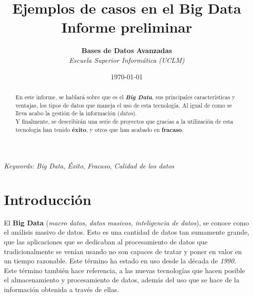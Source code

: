\documentclass[11pt]{diazessay} %
\title{\textbf{Ejemplos de casos en el Big Data \\ Informe preliminar}} %
\author{\textbf{Bases de Datos Avanzadas} \\ \textit{Escuela Superior Informática (UCLM)}} %
\date{\today} %
\begin{document}
\maketitle %




\begin{abstract}
	
En este informe, se hablará sobre que es el \textbf{\textit{Big Data}}, sus principales características y ventajas, los tipos de datos que maneja el uso de esta tecnología. Al igual de como se lleva acabo la gestión de la información (\textit{datos}).\\

Y finalmente, se describirán una serie de proyectos que gracias a la utilización de esta tecnología han tenido \textbf{éxito}, y otros que han acabado en \textbf{fracaso}.
\end{abstract}

\hspace*{3.6mm}\textit{Keywords:} \textit{Big Data}, \textit{Éxito}, \textit{Fracaso}, \textit{Calidad de los datos}

\vspace{20pt} %

\newpage
\section*{Introducción}

El \textbf{Big Data} \cite{wiki-data} (\textit{macro datos, datos masivos, inteligencia de datos}), se conoce como el análisis masivo de datos. Esto es una cantidad de datos tan sumamente grande, que las aplicaciones que se dedicaban al  procesamiento de datos que tradicionalmente se venían usando no son capaces de tratar y poner en valor en un tiempo razonable. Este  término ha estado en uso desde la década de \textit{1990}.\\
Este término también hace referencia, a las nuevas tecnologías que hacen posible el almacenamiento y procesamiento de datos, además del uso que se hace de la información obtenida a través de ellas.\\
\end{document}
